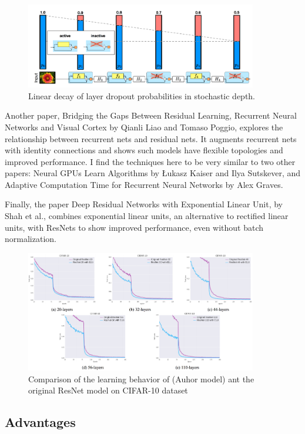 \documentclass[12pt]{article}
\numberwithin{equation}{section}
\numberwithin{table}{section}
\numberwithin{figure}{section}
\begin{document}
\begin{figure} \centering
	\includegraphics[width=0.9\textwidth]{image3.png}
	\caption{Linear decay of layer dropout probabilities in stochastic depth.}
	\label{figure3}
\end{figure}


Another paper, Bridging the Gaps Between Residual Learning, Recurrent Neural Networks and Visual Cortex by Qianli Liao and Tomaso Poggio, explores the relationship between recurrent nets and residual nets. It augments recurrent nets with identity connections and shows such models have flexible topologies and improved performance. I find the techniques here to be very similar to two other papers: Neural GPUs Learn Algorithms by Łukasz Kaiser and Ilya Sutskever, and Adaptive Computation Time for Recurrent Neural Networks by Alex Graves.

Finally, the paper Deep Residual Networks with Exponential Linear Unit, by Shah et al., combines exponential linear units, an alternative to rectified linear units, with ResNets to show improved performance, even without batch normalization.

\begin{figure} \centering
	\includegraphics[width=0.9\textwidth]{image4.png}
	\caption{Comparison of the learning behavior of (Auhor model) ant the original ResNet model on CIFAR-10 dataset}
	\label{figure4}
\end{figure}


\subsection{Advantages}
\end{document}
